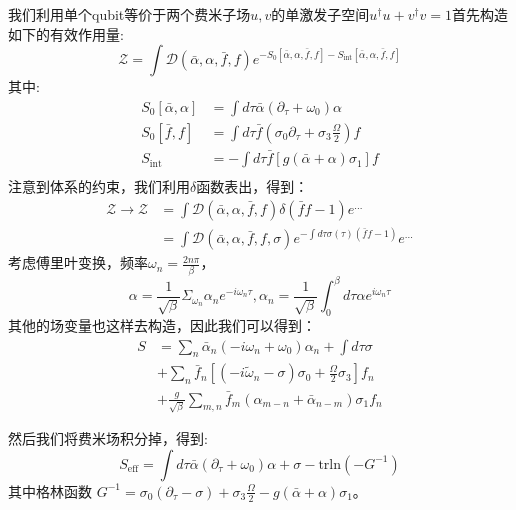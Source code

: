 \documentclass[supercite]{HustGraduPaper}
\begin{document}
我们利用单个qubit等价于两个费米子场$u,v$的单激发子空间$u^\dagger u + v^\dagger v= 1$首先构造如下的有效作用量:
\begin{equation}
\mathcal{Z} = \int \mathcal{D}(\bar\alpha,\alpha, \bar f,f)e^{-S_0[\bar\alpha,\alpha,\bar f,f]-S_{\text{int}}[\bar\alpha,\alpha,\bar f,f]}
\end{equation}
其中:
\begin{equation}
\begin{aligned}
S_0[\bar \alpha,\alpha] &=\int d \tau \bar \alpha(\partial_\tau + \omega_0) \alpha \\
S_0[\bar f,f] &= \int d \tau \bar f(\sigma_0 \partial_\tau + \sigma_3\frac{\Omega}{2})f\\
S_{\text{int}} &= -\int d \tau \bar f [g(\bar{\alpha}+\alpha)\sigma_1]f\\
\end{aligned}
\end{equation}
注意到体系的约束，我们利用$\delta$函数表出，得到：
\begin{equation}
\begin{aligned}
\mathcal{Z} \to \mathcal{Z} &= \int \mathcal{D}(\bar \alpha,\alpha, \bar f, f) \delta(\bar{f}f-1)e^{...}\\
& =  \int \mathcal{D}(\bar \alpha,\alpha, \bar f, f, \sigma) e^{-\int d\tau \sigma(\tau) (\bar{f}f-1)} e^{...}
\end{aligned}
\end{equation}
考虑傅里叶变换，频率$\omega_n = \frac{2n\pi}{\beta}$，
\begin{equation}
\alpha = \frac{1}{\sqrt{\beta}} \Sigma_{\omega_n} \alpha_n e^{-i \omega_n \tau},
\alpha_n = \frac{1}{\sqrt{\beta}} \int_{0}^{\beta} d\tau \alpha e^{i\omega_n \tau}
\end{equation}
其他的场变量也这样去构造，因此我们可以得到：
\begin{equation}
\begin{aligned}
S &= \sum_{n} \bar{\alpha}_n(-i \omega_n + \omega_0) \alpha_n + \int d \tau \sigma \\
& + \sum_{n} \bar{f}_n [(-i \tilde \omega_n - \sigma)\sigma_0 + \frac{\Omega}{2} \sigma_3] f_n \\
& + \frac{g}{\sqrt{\beta}}\sum_{m,n} \bar{f}_m (\alpha_{m-n} + \bar \alpha_{n-m})\sigma_1 f_n
\end{aligned}
\end{equation}

然后我们将费米场积分掉，得到:
\begin{equation}
S_{\text{eff}} = \int d\tau \bar \alpha (\partial_\tau+\omega_0) \alpha + \sigma  - \text{trln} (-G^{-1})
\end{equation}
其中格林函数 $G^{-1} = \sigma_0 (\partial_\tau-\sigma) + \sigma_3 \frac{\Omega }{2} - g (\bar \alpha + \alpha) \sigma_1$。
\end{document}

